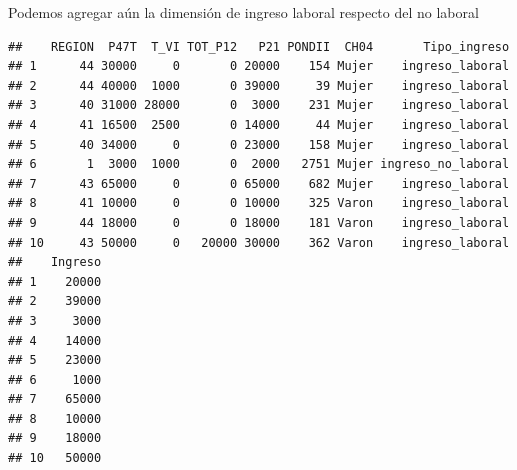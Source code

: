 \documentclass[]{book}
\newenvironment{Shaded}{\begin{snugshade}}{\end{snugshade}}
\newcommand{\CommentTok}[1]{\textcolor[rgb]{0.56,0.35,0.01}{\textit{#1}}}
\newcommand{\DataTypeTok}[1]{\textcolor[rgb]{0.13,0.29,0.53}{#1}}
\newcommand{\DecValTok}[1]{\textcolor[rgb]{0.00,0.00,0.81}{#1}}
\newcommand{\KeywordTok}[1]{\textcolor[rgb]{0.13,0.29,0.53}{\textbf{#1}}}
\newcommand{\NormalTok}[1]{#1}
\newcommand{\OperatorTok}[1]{\textcolor[rgb]{0.81,0.36,0.00}{\textbf{#1}}}
\newcommand{\StringTok}[1]{\textcolor[rgb]{0.31,0.60,0.02}{#1}}
\begin{document}
Podemos agregar aún la dimensión de ingreso laboral respecto del no laboral

\begin{Shaded}
\end{Shaded}

\begin{verbatim}
##    REGION  P47T  T_VI TOT_P12   P21 PONDII  CH04       Tipo_ingreso
## 1      44 30000     0       0 20000    154 Mujer    ingreso_laboral
## 2      44 40000  1000       0 39000     39 Mujer    ingreso_laboral
## 3      40 31000 28000       0  3000    231 Mujer    ingreso_laboral
## 4      41 16500  2500       0 14000     44 Mujer    ingreso_laboral
## 5      40 34000     0       0 23000    158 Mujer    ingreso_laboral
## 6       1  3000  1000       0  2000   2751 Mujer ingreso_no_laboral
## 7      43 65000     0       0 65000    682 Mujer    ingreso_laboral
## 8      41 10000     0       0 10000    325 Varon    ingreso_laboral
## 9      44 18000     0       0 18000    181 Varon    ingreso_laboral
## 10     43 50000     0   20000 30000    362 Varon    ingreso_laboral
##    Ingreso
## 1    20000
## 2    39000
## 3     3000
## 4    14000
## 5    23000
## 6     1000
## 7    65000
## 8    10000
## 9    18000
## 10   50000
\end{verbatim}
\end{document}
